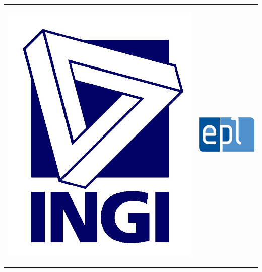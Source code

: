 \documentclass[a4paper ,12pt,french]{article}
\begin{document}
\newcommand{\HRule}{\rule{\linewidth}{0.5mm}} %

\begin{titlepage}
\pagestyle{fancy} %

\begin{tabular}{cc}
\begin{minipage}{0.5\textwidth}
\begin{flushleft}
\includegraphics[scale=0.1]{./logoingisbleu.jpg} %
\end{flushleft}
\end{minipage}
 & 
 \begin{minipage}{0.43\textwidth}
\begin{flushright}
\includegraphics[scale=0.5]{./epl.jpg} %
\end{flushright}
\end{minipage}
\end{tabular} 




\end{titlepage}
\end{document}
